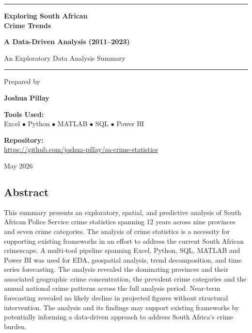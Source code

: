 \documentclass[titlepage, 12pt, oneside]{article}
\begin{document}
\begin{titlepage}
{\centering

\textcolor[HTML]{2E7D32}{\rule{0.8\linewidth}{1pt}}

\vspace{0.15cm}

{\Huge \textbf{Exploring South African\\[0.3cm] Crime Trends}}

\vspace{0.35cm}

{\Large \textbf{\textcolor[HTML]{2E7D32}{A Data-Driven Analysis (2011--2023)}}}

\vspace{0.35cm}

{\large An Exploratory Data Analysis Summary}

\textcolor[HTML]{2E7D32}{\rule{0.8\linewidth}{1pt}}

\vspace{0.5cm}

{\large Prepared by}

\vspace{0.25cm}

{\Large \textbf{Joshua Pillay}}

\vspace{0.75cm}

{\large \textcolor[HTML]{2E7D32}{\textbf{Tools Used:}}}\\[0.03cm] 
{\large Excel $\bullet$ Python $\bullet$ MATLAB $\bullet$ SQL $\bullet$ Power BI}

\vspace{0.45cm}

{\large \textcolor[HTML]{2E7D32}{\textbf{Repository:}}}\\[0.03cm] 
{\large \url{https://github.com/joshua-pillay/sa-crime-statistics}}

\vspace{0.45cm}

{\large May 2026}

\vspace{0.25cm}}

\subsection*{\centering Abstract}
\noindent This summary presents an exploratory, spatial, and predictive analysis of South African Police Service crime statistics spanning 12 years across nine provinces and seven crime categories. The analysis of crime statistics is a necessity for supporting existing frameworks in an effort to address the current South African crimescape. A multi-tool pipeline spanning Excel, Python, SQL, MATLAB and Power BI was used for EDA, geospatial analysis, trend decomposition, and time series forecasting. The analysis revealed the dominating provinces and their associated geographic crime concentration, the prevalent crime categories and the annual national crime patterns across the full analysis period. Near-term forecasting revealed no likely decline in projected figures without structural intervention. The analysis and its findings may support existing frameworks by potentially informing a data-driven approach to address South Africa's crime burden.



\end{titlepage}
\end{document}
